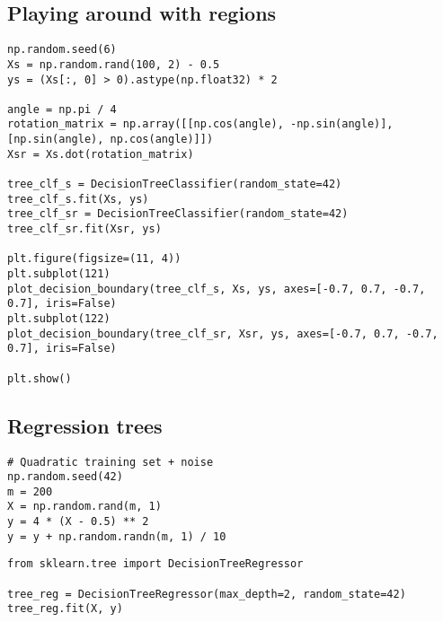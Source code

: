 \documentclass[%
oneside,                 %
final,                   %
10pt]{article}
\begin{document}
\subsection*{Playing around with regions}
\begin{verbatim}
np.random.seed(6)
Xs = np.random.rand(100, 2) - 0.5
ys = (Xs[:, 0] > 0).astype(np.float32) * 2

angle = np.pi / 4
rotation_matrix = np.array([[np.cos(angle), -np.sin(angle)], [np.sin(angle), np.cos(angle)]])
Xsr = Xs.dot(rotation_matrix)

tree_clf_s = DecisionTreeClassifier(random_state=42)
tree_clf_s.fit(Xs, ys)
tree_clf_sr = DecisionTreeClassifier(random_state=42)
tree_clf_sr.fit(Xsr, ys)

plt.figure(figsize=(11, 4))
plt.subplot(121)
plot_decision_boundary(tree_clf_s, Xs, ys, axes=[-0.7, 0.7, -0.7, 0.7], iris=False)
plt.subplot(122)
plot_decision_boundary(tree_clf_sr, Xsr, ys, axes=[-0.7, 0.7, -0.7, 0.7], iris=False)

plt.show()
\end{verbatim}

\subsection*{Regression trees}
\begin{verbatim}
# Quadratic training set + noise
np.random.seed(42)
m = 200
X = np.random.rand(m, 1)
y = 4 * (X - 0.5) ** 2
y = y + np.random.randn(m, 1) / 10
\end{verbatim}

\begin{verbatim}
from sklearn.tree import DecisionTreeRegressor

tree_reg = DecisionTreeRegressor(max_depth=2, random_state=42)
tree_reg.fit(X, y)
\end{verbatim}

\end{document}
